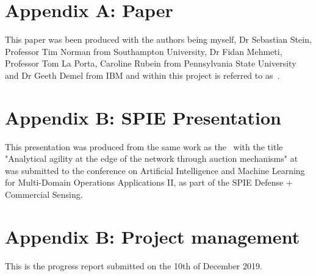 
\section*{Appendix A: Paper}
This paper was been produced with the authors being myself, Dr Sebastian Stein, Professor Tim Norman from Southampton
University, Dr Fidan Mehmeti, Professor Tom La Porta, Caroline Rubein from Pennsylvania State University and Dr Geeth
Demel from IBM and within this project is referred to as~\cite{FlexibleResourceAllocation}.



\section*{Appendix B: SPIE Presentation}
This presentation was produced from the same work as the~\cite{FlexibleResourceAllocation} with the title "Analytical
agility at the edge of the network through auction mechanisms" at was submitted to the conference on Artificial
Intelligence and Machine Learning for Multi-Domain Operations Applications II, as part of the SPIE Defense + Commercial
Sensing.



\section*{Appendix B: Project management}
This is the progress report submitted on the 10th of December 2019.


